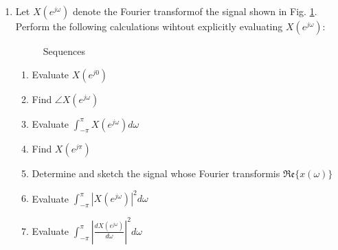 \documentclass[11pt]{article}
\newcommand\ft{Fourier transform}
\begin{document}
\begin{enumerate}
	\item Let $X\left(e^{j\omega}\right)$ denote the \ft of the signal shown in Fig. \ref{fi:p523}. Perform the following calculations wihtout explicitly evaluating $X\left(e^{j\omega}\right)$:
 	\begin{figure}
		
		\caption{Sequences}
		\label{fi:p523}
	\end{figure}
	\begin{enumerate}
		\item Evaluate $X\left(e^{j0}\right)$
		\item Find $\angle X\left(e^{j\omega}\right)$
		\item Evaluate $\int_{-\pi}^{\pi}X\left(e^{j\omega}\right)d\omega$
		\item Find $X\left(e^{j\pi}\right)$
		\item Determine and sketch the signal whose \ft is $\mathfrak{Re}\{x(\omega)\}$
		\item Evaluate $\int_{-\pi}^{\pi}\left|X\left(e^{j\omega}\right)\right|^2d\omega$
		\item Evaluate $\int_{-\pi}^{\pi}\left|\frac{dX\left(e^{j\omega}\right)}{d\omega}\right|^2d\omega$		
	\end{enumerate}
	

    
\end{enumerate}
\end{document}

